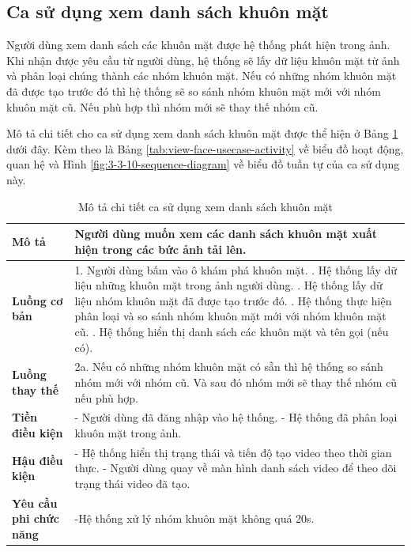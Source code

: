 \subsection{Ca sử dụng xem danh sách khuôn mặt}

Người dùng xem danh sách các khuôn mặt được hệ thống phát hiện trong ảnh. Khi nhận được yêu cầu từ người dùng, hệ thống sẽ lấy dữ liệu khuôn mặt từ ảnh và phân loại chúng thành các nhóm khuôn mặt. Nếu có những nhóm khuôn mặt đã được tạo trước đó thì hệ thống sẽ so sánh nhóm khuôn mặt mới với nhóm khuôn mặt cũ. Nếu phù hợp thì nhóm mới sẽ thay thế nhóm cũ.  

Mô tả chi tiết cho ca sử dụng xem danh sách khuôn mặt được thể hiện ở Bảng \ref{tab:view-face-usecase} dưới đây. Kèm theo là Bảng \ref{tab:view-face-usecase-activity} về biểu đồ hoạt động, quan hệ và Hình \ref{fig:3-3-10-sequence-diagram} về biểu đồ tuần tự của ca sử dụng này. 

\noindent 
\begin{table}[H]
\centering
\caption{Mô tả chi tiết ca sử dụng xem danh sách khuôn mặt}
\label{tab:view-face-usecase}
\begin{tabularx}{\linewidth}{| l | X |} 
\hline 
\textbf{Mô tả} & Người dùng muốn xem các danh sách khuôn mặt xuất hiện trong các bức ảnh tải lên. \\
\hline 
\textbf{Luồng cơ bản} & 1. Người dùng bấm vào ô khám phá khuôn mặt. \newline
                       2. Hệ thống lấy dữ liệu những khuôn mặt trong ảnh người dùng. \newline
                       3. Hệ thống lấy dữ liệu nhóm khuôn mặt đã được tạo trước đó. \newline
                       4. Hệ thống thực hiện phân loại và so sánh nhóm khuôn mặt mới với nhóm khuôn mặt cũ. \newline
                       5. Hệ thống hiển thị danh sách các khuôn mặt và tên gọi (nếu có). \\
\hline
\textbf{Luồng thay thế} & 2a. Nếu có những nhóm khuôn mặt có sẵn thì hệ thống so sánh nhóm mới với nhóm cũ. Và sau đó nhóm mới sẽ thay thế nhóm cũ nếu phù hợp. \\
\hline
\textbf{Tiền điều kiện} & - Người dùng đã đăng nhập vào hệ thống. \newline
                           - Hệ thống đã phân loại khuôn mặt trong ảnh. \\
\textbf{Hậu điều kiện} & - Hệ thống hiển thị trạng thái và tiến độ tạo video theo thời gian thực. \newline
                         - Người dùng quay về màn hình danh sách video để theo dõi trạng thái video đã tạo. \\
\hline 
\textbf{Yêu cầu phi chức năng} & -Hệ thống xử lý nhóm khuôn mặt không quá 20s. \\
\hline 
\end{tabularx}
\end{table}

